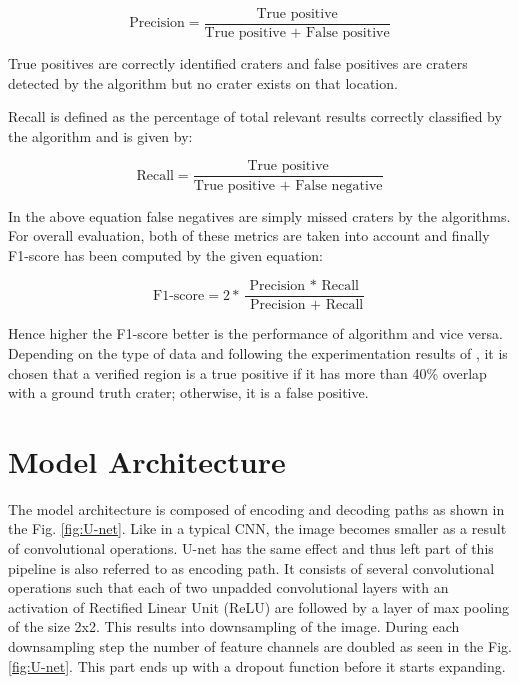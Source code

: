 \documentclass[11pt]{article}
\begin{document}
\begin{equation}
\text{Precision} = \frac{\text{True positive}}{\text{True positive + False positive}}
\label{precision}
\end{equation}

True positives are correctly identified craters and false positives are craters detected by the algorithm but no crater exists on that location.

Recall is defined as the percentage of total relevant results correctly classified by the algorithm and is given by:

\begin{equation}
\text{Recall} = \frac{\text{True positive}}{\text{True positive + False negative}}
\label{recall}
\end{equation}

In the above equation false negatives are simply missed craters by the algorithms. For overall evaluation, both of these metrics are taken into account and finally F1-score has been computed by the given equation:

\begin{equation}
\text{F1-score} =2 * \frac{\text { Precision } * \text { Recall }}{\text { Precision }+\text { Recall}}
\label{f1}
\end{equation}

Hence higher the F1-score better is the performance of algorithm and vice versa. Depending on the type of data and following the experimentation results of \cite{emami2015automatic}, it is chosen that a verified region is a true positive if it has more than 40\% overlap with a ground truth crater; otherwise, it is a false positive.

\section{Model Architecture}
The model architecture is composed of encoding and decoding paths as shown in the Fig. \ref{fig:U-net}. Like in a typical CNN, the image becomes smaller as a result of convolutional operations. U-net has the same effect and thus left part of this pipeline is also referred to as encoding path. It consists of several convolutional operations such that each of two unpadded convolutional layers with an activation of Rectified Linear Unit (ReLU) are followed by a layer of max pooling of the size 2x2. This results into downsampling of the image. During each downsampling step the number of feature channels are doubled as seen in the Fig. \ref{fig:U-net}. This part ends up with a dropout function before it starts expanding.
\end{document}
